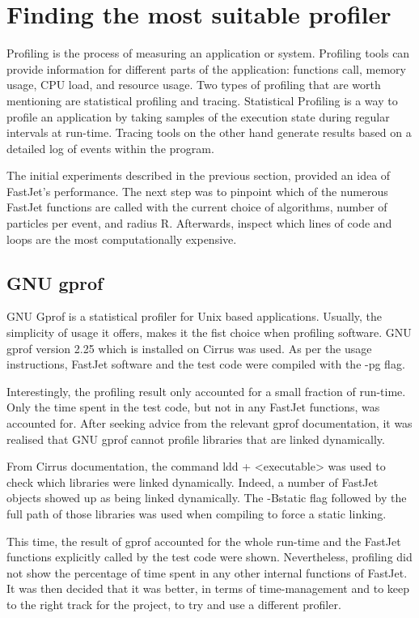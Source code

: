 \section{Finding the most suitable profiler}
Profiling is the process of measuring an application or system. Profiling tools can provide information for different parts of the application: functions call, memory usage, CPU load, and resource usage. Two types of profiling that are worth mentioning are statistical profiling and tracing. Statistical Profiling is a way to profile an application by taking samples of the execution state during regular intervals at run-time. Tracing tools on the other hand generate results based on a detailed log of events within the program.

The initial experiments described in the previous section, provided an idea of FastJet's performance. The next step was to pinpoint which of the numerous FastJet functions are called with the current choice of algorithms, number of particles per event, and radius R. Afterwards, inspect which lines of code and loops are the most computationally expensive. 

\subsection{GNU gprof}

GNU Gprof is a statistical profiler for Unix based applications. Usually, the simplicity of usage it offers, makes it the fist choice when profiling software. GNU gprof version 2.25 which is installed on Cirrus was used. As per the usage instructions, FastJet software and the test code were compiled with the -pg flag. 

Interestingly, the profiling result only accounted for a small fraction of run-time. Only the time spent in the test code, but not in any FastJet functions, was accounted for. After seeking advice from the relevant gprof documentation, it was realised that GNU gprof cannot profile libraries that are linked dynamically. 

From Cirrus documentation, the command ldd + <executable> was used to check which libraries were linked dynamically. Indeed, a number of FastJet objects showed up as being linked dynamically. The -Bstatic flag followed by the full path of those libraries was used when compiling to force a static linking.

This time, the result of gprof accounted for the whole run-time and the FastJet functions explicitly called by the test code were shown. Nevertheless, profiling did not show the percentage of time spent in any other internal functions of FastJet. It was then decided that it was better, in terms of time-management and to keep to the right track for the project, to try and use a different profiler.


